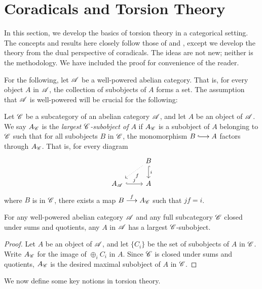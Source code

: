 \newpage
\section{Coradicals and Torsion Theory}\label{sect_torsion_theory}

In this section, we develop the basics of torsion theory in a 
categorical setting. The concepts and results here closely follow
those of \cite{BJV} and \cite{DTor}, except we develop the theory
from the dual perspective of coradicals. The ideas are not new;
neither is the methodology. We have included the proof for 
convenience of the reader.

For the following, let $\mathscr{A}$ be a well-powered abelian category.
That is, for every object $A$ in $\mathscr{A}$, the collection of 
subobjects of $A$ forms a set. The assumption that $\mathscr{A}$ is
well-powered will be crucial for the following:

\begin{defn}
Let $\mathscr{C}$ be a subcategory of an abelian category $\mathscr{A}$, 
and let $A$ be an object of $\mathscr{A}$. We say $A_{\mathscr{C}}$ is the 
\emph{largest $\mathscr{C}$-subobject of $A$} if $A_{\mathscr{C}}$ is a 
subobject of $A$ belonging to $\mathscr{C}$ such that for all 
subobjects $B$ in $\mathscr{C}$, the monomorphism $B \into A$ factors
through $A_{\mathscr{C}}$. That is, for every diagram
\[
\begin{tikzcd}
{} &
B \arrow[hook]{d}{i} \arrow[dotted]{ld}{f} \\
A_{\Cat{A}} \arrow[hook]{r}{j} & A
\end{tikzcd}
\]
where $B$ is in $\mathscr{C}$, there exists a map $B \stackrel{f}{\longrightarrow} 
A_{\mathscr{C}}$ such that $jf = i$.
\end{defn}

\begin{prop}\label{prop_max_subobj}
For any well-powered abelian category $\mathscr{A}$ and any full 
subcategory $\mathscr{C}$ closed under sums and quotients, any $A$ in 
$\mathscr{A}$ has a largest $\mathscr{C}$-subobject.
\end{prop}
\begin{proof}
Let $A$ be an object of $\mathscr{A}$, and let $\{C_i\}$ be the set 
of subobjects of $A$ in $\mathscr{C}$. Write $A_{\mathscr{C}}$ for the
image of $\oplus_{i} C_i$ in $A$. Since $\mathscr{C}$ is closed under
sums and quotients, $A_{\mathscr{C}}$ is the desired maximal subobject 
of $A$ in $\mathscr{C}$.
\end{proof}

We now define some key notions in torsion theory.


